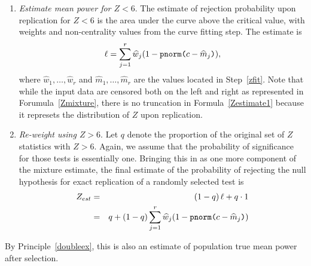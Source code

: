 \documentclass[jou]{apa6} %
\newcommand{\R}[1]{\mbox{\texttt{#1}}} %
\begin{document}
\begin{enumerate}
The finite mixture model is only an approximation. If the true probability density function of $Z$ given significance were known, the approximation could be optimized by choosing $w_1, \ldots, w_r$ and $m_1, \ldots, m_r$ to bring (\ref{Zmixture}) as close to the true density as possible. Since the true density is unknown, we use a kernel density estimate \parencite{Silverman1986} as implemented in R's \texttt{density} function, with the default settings.   

Specifically, the fitting step proceeds as follows. First, obtain the kernel density estimate based on the sample of significant $Z$ values, re-scaling it so that the area under the curve between 1.96 and 6 equals one. Call this the \emph{conditional density estimate}. Next, calculate the conditional density estimate at a set of equally spaced points ranging from 2 to 6. Then, numerically choose $w_j$ and $m_j$ values so as to minimize the sum of absolute differences between the conditional density estimate and~(\ref{Zmixture}).  

     \item \emph{Estimate mean power for $Z<6$}. The estimate of rejection probability upon replication for $Z<6$ is the area under the curve above the critical value, with weights and non-centrality values from the curve fitting step. The estimate is
\begin{equation} \label{Zestimate1}
    \ell = \sum_{j=1}^r \widehat{w}_j (1-\R{pnorm(}c-\widehat{m}_j\R{)}),
\end{equation}
where $\widehat{w}_1, \ldots, \widehat{w}_r$ and $\widehat{m}_1, \ldots, \widehat{m}_r$ are the values located in Step~\ref{zfit}. Note that while the input data are censored both on the left and right as represented in Forumula~\ref{Zmixture}, there is no truncation in Formula~\ref{Zestimate1} because it represets the distribution of $Z$ upon replication.
     \item \emph{Re-weight using $Z>6$}. Let $q$ denote the proportion of the original set of $Z$ statistics with $Z>6$. Again, we assume that the probability of significance for those tests is essentially one. Bringing this in as one more component of the mixture estimate, the final estimate of the probability of rejecting the null hypothesis for exact replication of a randomly selected test is  
\begin{eqnarray} \label{zcurveestimate}
    Z_{est} &=& (1-q) \, \ell + q \cdot 1 \\ \nonumber
      &=& q + (1-q)\sum_{j=1}^r \widehat{w}_j (1-\R{pnorm(}c-\widehat{m}_j\R{)})
\end{eqnarray}

\end{enumerate}
By Principle~\ref{doubleex}, this is also an estimate of population true mean power after selection.
\end{document}
